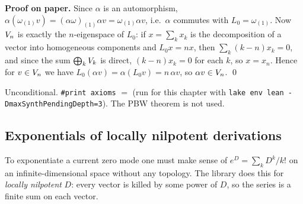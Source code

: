 \textbf{Proof on paper.} Since $\alpha$ is an automorphism, $\alpha(\omega_{(1)}v) = (\alpha\omega)_{(1)}\alpha v =
\omega_{(1)}\alpha v$, i.e.\ $\alpha$ commutes with $L_0=\omega_{(1)}$. Now $V_n$ is exactly the $n$-eigenspace of
$L_0$: if $x=\sum_kx_k$ is the decomposition of a vector into homogeneous components and $L_0x = nx$, then
$\sum_k(k-n)x_k = 0$, and since the sum $\bigoplus_kV_k$ is direct, $(k-n)x_k=0$ for each $k$, so $x = x_n$.
Hence for $v\in V_n$ we have $L_0(\alpha v) = \alpha(L_0v) = n\,\alpha v$, so $\alpha v\in V_n$. \qed

\begin{status}
Unconditional. \texttt{\#print axioms}  $=$
\lean{[propext, Classical.}\allowbreak{}\allowbreak\lean{sound]} (run for this chapter with
\texttt{lake env lean -DmaxSynthPendingDepth=3}). The PBW theorem  is not used.
\end{status}

\subsection{Exponentials of locally nilpotent derivations}

To exponentiate a current zero mode one must make sense of $e^D = \sum_k D^k/k!$ on an
infinite-dimensional space without any topology. The library does this for \emph{locally
nilpotent} $D$: every vector is killed by some power of $D$, so the series is a finite sum on each
vector.

